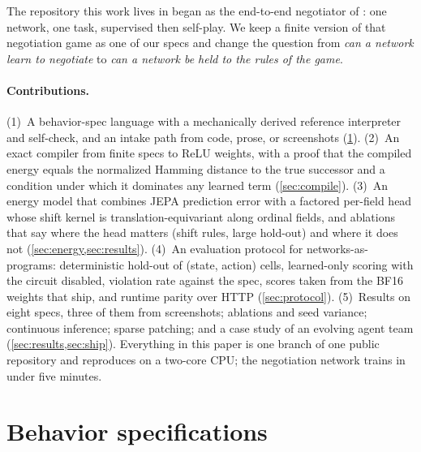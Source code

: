 \documentclass{article}
\theoremstyle{plain}
\theoremstyle{definition}
\theoremstyle{remark}
\begin{document}
The repository this work lives in began as the end-to-end negotiator of \citet{lewis2017deal}: one network, one task, supervised then self-play. We keep a finite version of that negotiation game as one of our specs and change the question from \emph{can a network learn to negotiate} to \emph{can a network be held to the rules of the game}.

\paragraph{Contributions.}
(1)~A behavior-spec language with a mechanically derived reference interpreter and self-check, and an intake path from code, prose, or screenshots (\cref{sec:spec}).
(2)~An exact compiler from finite specs to ReLU weights, with a proof that the compiled energy equals the normalized Hamming distance to the true successor and a condition under which it dominates any learned term (\cref{sec:compile}).
(3)~An energy model that combines JEPA prediction error with a factored per-field head whose shift kernel is translation-equivariant along ordinal fields, and ablations that say where the head matters (shift rules, large hold-out) and where it does not (\cref{sec:energy,sec:results}).
(4)~An evaluation protocol for networks-as-programs: deterministic hold-out of (state, action) cells, learned-only scoring with the circuit disabled, violation rate against the spec, scores taken from the BF16 weights that ship, and runtime parity over HTTP (\cref{sec:protocol}).
(5)~Results on eight specs, three of them from screenshots; ablations and seed variance; continuous inference; sparse patching; and a case study of an evolving agent team (\cref{sec:results,sec:ship}).
Everything in this paper is one branch of one public repository and reproduces on a two-core CPU; the negotiation network trains in under five minutes.

\section{Behavior specifications}
\label{sec:spec}
\end{document}
